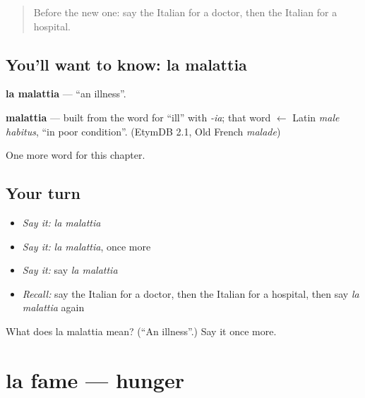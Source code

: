 \label{lesson:IT-C41-malattia}



\begin{quote}
Before the new one: say the Italian for a doctor, then the Italian for a hospital.
\end{quote}

\subsection*{You'll want to know: la malattia}
\textbf{la malattia} — \textquotedblleft{}an illness\textquotedblright{}.

\begin{cousinweb}
\textbf{malattia} — built from the word for \textquotedblleft{}ill\textquotedblright{} with \emph{-ia}; that word $\leftarrow$ Latin \emph{male habitus}, \textquotedblleft{}in poor condition\textquotedblright{}. (EtymDB 2.1, Old French \emph{malade})
\end{cousinweb}

\begin{grammarlens}[title={What you've built}]
One more word for this chapter.
\end{grammarlens}

\subsection*{Your turn}
\begin{itemize}
\raggedright
  \item \emph{Say it:} \emph{la malattia}
  \item \emph{Say it:} \emph{la malattia}, once more
  \item \emph{Say it:} say \emph{la malattia}
  \item \emph{Recall:} say the Italian for a doctor, then the Italian for a hospital, then say \emph{la malattia} again
\end{itemize}

\begin{tcolorbox}[breakable,colback=teal!4,colframe=teal!35!black,title={Before you move on}]
What does la malattia mean? (\textquotedblleft{}An illness\textquotedblright{}.) Say it once more.
\end{tcolorbox}
\section[la fame]{la fame — hunger}

\label{lesson:IT-C41-fame}



